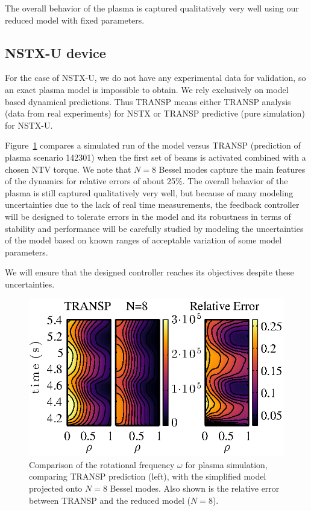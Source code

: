 \documentclass[12pt,lot, lof]{puthesis}
\begin{document}
The overall behavior of the plasma is captured qualitatively very well using our reduced model with fixed parameters.

\subsection{NSTX-U device}


For the case of NSTX-U, we do not have any experimental data for validation, so an exact plasma model is impossible to obtain. We rely exclusively on model based dynamical predictions. Thus TRANSP means either TRANSP analysis (data from real experiments) for NSTX or TRANSP predictive (pure simulation) for NSTX-U.

 Figure~\ref{heho2} compares a simulated run of the model versus TRANSP (prediction of plasma scenario 142301) when the first set of beams is activated combined with a chosen NTV torque.
We note that $N = 8$ Bessel modes capture the main features of the dynamics for relative errors of about 25\%.
The overall behavior of the plasma is still captured qualitatively very well, but because of many modeling uncertainties due to the lack of real time measurements, the feedback controller will be designed to tolerate errors in the model and its robustness in terms of stability and performance will be carefully studied by modeling the uncertainties of the model based on known ranges of acceptable variation of some model parameters.

We will ensure that the designed controller reaches its objectives despite these uncertainties.
\begin{figure}[htbp]
\centering
\includegraphics [width=0.8 \linewidth]{chap10/fig10} 
\caption{Comparison of the rotational frequency $\omega$ for plasma simulation, comparing TRANSP prediction (left), with the simplified model projected onto $N=8$ Bessel modes.  Also shown is the relative error between TRANSP and the reduced model ($N=8$).}
\label{heho2}
\end{figure}
\end{document}
